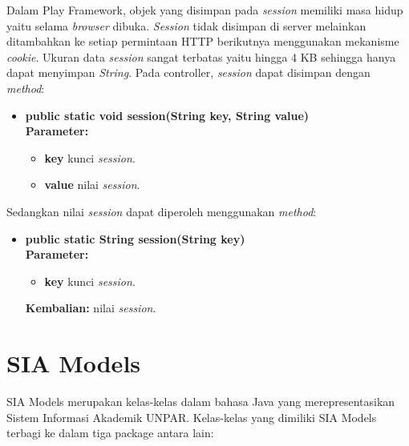 Dalam Play Framework, objek yang disimpan pada \textit{session} memiliki masa hidup yaitu selama \textit{browser} dibuka. \textit{Session} tidak disimpan di server melainkan ditambahkan ke setiap permintaan HTTP berikutnya menggunakan mekanisme \textit{cookie}. Ukuran data \textit{session} sangat terbatas yaitu hingga 4 KB sehingga hanya dapat menyimpan \textit{String}. Pada controller, \textit{session} dapat disimpan dengan \textit{method}:
	\begin{itemize}
			\item \textbf{public static void session(String key, String value)} \\
				\textbf{Parameter:}
				\begin{itemize}
					\item \textbf{key} kunci \textit{session}.
					\item \textbf{value} nilai \textit{session}.
				\end{itemize}
	\end{itemize}
 Sedangkan nilai \textit{session} dapat diperoleh menggunakan \textit{method}: 
\begin{itemize}
			\item \textbf{public static String session(String key)} \\
				\textbf{Parameter:}
				\begin{itemize}
					\item \textbf{key} kunci \textit{session}.
				\end{itemize}
				\textbf{Kembalian:} nilai \textit{session}.
	\end{itemize}


\section{SIA Models}
\label{sec:siamodels}
SIA Models merupakan kelas-kelas dalam bahasa Java yang merepresentasikan Sistem Informasi Akademik UNPAR\cite{siamodels}. Kelas-kelas yang dimiliki SIA Models terbagi ke dalam tiga package antara lain:

